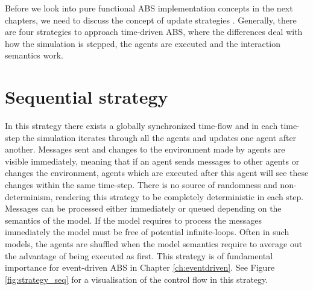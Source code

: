 Before we look into pure functional ABS implementation concepts in the next chapters, we need to discuss the concept of update strategies \cite{thaler_art_2017}. Generally, there are four strategies to approach time-driven ABS, where the differences deal with how the simulation is stepped, the agents are executed and the interaction semantics work.


\section{Sequential strategy}
\label{sec:seq_strategy}
In this strategy there exists a globally synchronized time-flow and in each time-step the simulation iterates through all the agents and updates one agent after another. Messages sent and changes to the environment made by agents are visible immediately, meaning that if an agent sends messages to other agents or changes the environment, agents which are executed after this agent will see these changes within the same time-step. There is no source of randomness and non-determinism, rendering this strategy to be completely deterministic in each step. Messages can be processed either immediately or queued depending on the semantics of the model. If the model requires to process the messages immediately the model must be free of potential infinite-loops. Often in such models, the agents are shuffled when the model semantics require to average out the advantage of being executed as first. This strategy is of fundamental importance for event-driven ABS in Chapter \ref{ch:eventdriven}. See Figure \ref{fig:strategy_seq} for a visualisation of the control flow in this strategy.

